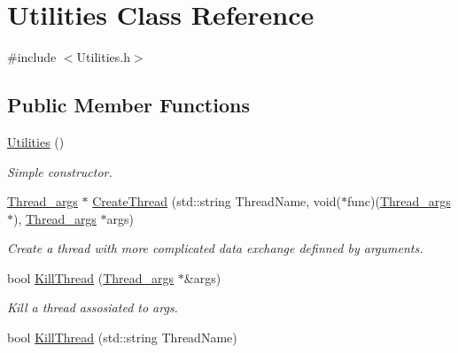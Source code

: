 \hypertarget{classUtilities}{\section{Utilities Class Reference}
\label{classUtilities}
}


{\ttfamily \#include $<$Utilities.\-h$>$}

\subsection*{Public Member Functions}
\begin{DoxyCompactItemize}
\item 
\hypertarget{classUtilities_ab1676c9ce35cf347a73d16f1094e1271}{\hyperlink{classUtilities_ab1676c9ce35cf347a73d16f1094e1271}{Utilities} ()}\label{classUtilities_ab1676c9ce35cf347a73d16f1094e1271}

\begin{DoxyCompactList}\small\item\em Simple constructor. \end{DoxyCompactList}\item 
\hypertarget{classUtilities_ae52d1dd16b34518b2ef4de01660cb8b2}{\hyperlink{structThread__args}{Thread\-\_\-args} $\ast$ \hyperlink{classUtilities_ae52d1dd16b34518b2ef4de01660cb8b2}{Create\-Thread} (std\-::string Thread\-Name, void($\ast$func)(\hyperlink{structThread__args}{Thread\-\_\-args} $\ast$), \hyperlink{structThread__args}{Thread\-\_\-args} $\ast$args)}\label{classUtilities_ae52d1dd16b34518b2ef4de01660cb8b2}

\begin{DoxyCompactList}\small\item\em Create a thread with more complicated data exchange definned by arguments. \end{DoxyCompactList}\item 
\hypertarget{classUtilities_a6f1c1d53b9ce59bb26c56a3bebdbb255}{bool \hyperlink{classUtilities_a6f1c1d53b9ce59bb26c56a3bebdbb255}{Kill\-Thread} (\hyperlink{structThread__args}{Thread\-\_\-args} $\ast$\&args)}\label{classUtilities_a6f1c1d53b9ce59bb26c56a3bebdbb255}

\begin{DoxyCompactList}\small\item\em Kill a thread assosiated to args. \end{DoxyCompactList}\item 
\hypertarget{classUtilities_a8c17a46ce33b0b647797f24bc859bd7a}{bool \hyperlink{classUtilities_a8c17a46ce33b0b647797f24bc859bd7a}{Kill\-Thread} (std\-::string Thread\-Name)}\label{classUtilities_a8c17a46ce33b0b647797f24bc859bd7a}


\end{DoxyCompactItemize}
